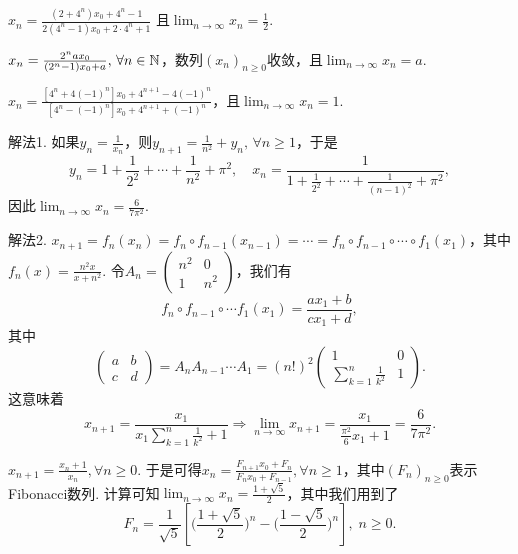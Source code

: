 \setcounter{solution}{41}

\begin{solution}
  $x_n=\frac{(2+4^n)x_0+4^n-1}{2(4^n-1)x_0+2\cdot4^n+1}$
  且$\lim_{n\to\infty}x_n=\frac12$.
\end{solution}

\begin{solution}
  $x_n=\frac{2^nax_0}{(2^n-1)x_0+a},\,\forall n\in\mathbb N$，数列$(x_n)_{n\ge0}$收敛，且$\lim_{n\to\infty}x_n=a$.
\end{solution}

\begin{solution}
  $x_n=\frac{[4^n+4(-1)^n]x_0+4^{n+1}-4(-1)^n}
  {[4^n-(-1)^n]x_0+4^{n+1}+(-1)^n}$，且$\lim_{n\to\infty}x_n=1$.
\end{solution}

\begin{solution}
  {\kaishu 解法1.} 如果$y_n=\frac1{x_n}$，则$y_{n+1}=\frac1{n^2}+y_n,\,\forall n\ge1$，于是
  \[
    y_n = 1 + \frac1{2^2} + \cdots + \frac1{n^2} + \pi^2,\quad x_n = \frac1{1+\frac1{2^2}
    +\cdots + \frac1{(n-1)^2}+\pi^2},
  \]
  因此$\lim_{n\to\infty}x_n=\frac6{7\pi^2}$.

  {\kaishu 解法2.} $x_{n+1}=f_n(x_n)=f_n\circ f_{n-1}(x_{n-1})=\cdots=f_n\circ f_{n-1}\circ\cdots\circ f_1(x_1)$，其中$f_n(x)=\frac{n^2x}{x+n^2}$. 令$A_n=\begin{pmatrix}
    n^2 & 0 \\
    1 & n^2
  \end{pmatrix}$，我们有
  \[
    f_n \circ f_{n-1} \circ \cdots f_1(x_1) =
    \frac{ax_1+b}{cx_1+d},
  \]
  其中
  \[
    \begin{pmatrix}
      a & b \\
      c & d
    \end{pmatrix} = A_nA_{n-1}\cdots A_1 = (n!)^2
    \begin{pmatrix}
      1 & 0 \\
      \sum_{k=1}^n\frac1{k^2} & 1
    \end{pmatrix}.
  \]
  这意味着
  \[
    x_{n+1} = \frac{x_1}{x_1\sum_{k=1}^n\frac1{k^2}+1}
    \Rightarrow \lim_{n\to\infty}x_{n+1}
    =\frac{x_1}{\frac{\pi^2}6x_1+1} = \frac6{7\pi^2}.
  \]
\end{solution}

\begin{solution}
  $x_{n+1}=\frac{x_n+1}{x_n},\forall n\ge0$. 于是可得$x_n=\frac{F_{n+1}x_0+F_n}{F_nx_0+F_{n-1}},\forall n\ge1$，其中$(F_n)_{n\ge0}$表示Fibonacci数列. 计算可知$\lim_{n\to\infty}x_n=\frac{1+\sqrt5}2$，其中我们用到了
  \[
    F_n = \frac1{\sqrt5} \left[ \bigg(
    \frac{1 + \sqrt5}2\bigg)^n - \bigg(
    \frac{1 - \sqrt5}2\bigg)^n \right],\;n\ge0.
  \]
\end{solution}

